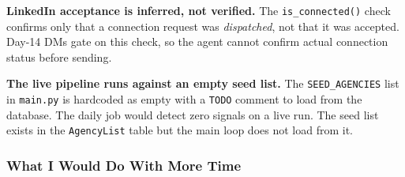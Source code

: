 \documentclass[11pt, letterpaper]{article}
\begin{document}
\textbf{LinkedIn acceptance is inferred, not verified.} The
\texttt{is\_connected()} check confirms only that a connection request was
\emph{dispatched}, not that it was accepted. Day-14 DMs gate on this check, so
the agent cannot confirm actual connection status before sending.

\textbf{The live pipeline runs against an empty seed list.} The \texttt{SEED\_AGENCIES}
list in \texttt{main.py} is hardcoded as empty with a \texttt{TODO} comment to
load from the database. The daily job would detect zero signals on a live run.
The seed list exists in the \texttt{AgencyList} table but the main loop does
not load from it.

\subsubsection{What I Would Do With More Time}
\end{document}
